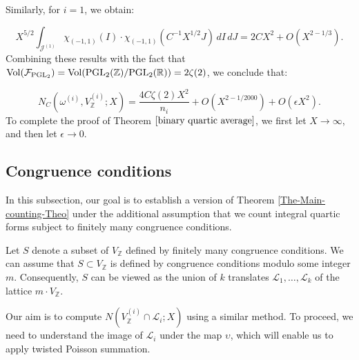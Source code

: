 \documentclass{article}
\def\Z{{\mathbb Z}}
\def\PGL{{\rm PGL}}
\def\Vol{{\rm Vol}}
\def\Z{{\mathbb Z}}
\begin{document}
Similarly, for $i = 1$, we obtain:

\begin{equation*}
  X^{5/2} \int_{\mathcal{J}^{(1)}} \chi_{(-1,1)}(I) \cdot \chi_{(-1,1)}(C^{-1}X^{1/2}J) \, dI \, dJ = 2CX^2 + O(X^{2 - 1/3}).
\end{equation*}
Combining these results with the fact that $\Vol(\mathcal{F}_{\PGL_2}) = \Vol(\PGL_2(\mathbb{Z}) / \PGL_2(\mathbb{R})) = 2\zeta(2)$, we conclude that:

\begin{equation*}
N_C(\omega^{(i)}, V_{\Z}^{(i)}; X) = \frac{4C \zeta(2)X^2}{n_i} + O(X^{2 - 1/2000}) + O(\epsilon X^2).
\end{equation*}
To complete the proof of Theorem $\ref{binary quartic average}$, we first let $X \to \infty$, and then let $\epsilon \to 0$.

\subsection{Congruence conditions}
In this subsection, our goal is to establish a version of Theorem \ref{The-Main-counting-Theo} under the additional assumption that we count integral quartic forms subject to finitely many congruence conditions.

Let $S$ denote a subset of $V_{\mathbb{Z}}$ defined by finitely many congruence conditions. We can assume that $S \subset V_{\mathbb{Z}}$ is defined by congruence conditions modulo some integer $m$. Consequently, $S$ can be viewed as the union of $k$ translates $\mathcal{L}_1, \ldots, \mathcal{L}_k$ of the lattice $m \cdot V_{\mathbb{Z}}$.

Our aim is to compute $N(V_{\mathbb{Z}}^{(i)} \cap \mathcal{L}_i; X)$ using a similar method. To proceed, we need to understand the image of $\mathcal{L}_i$ under the map $\upsilon$, which will enable us to apply twisted Poisson summation.
\end{document}
